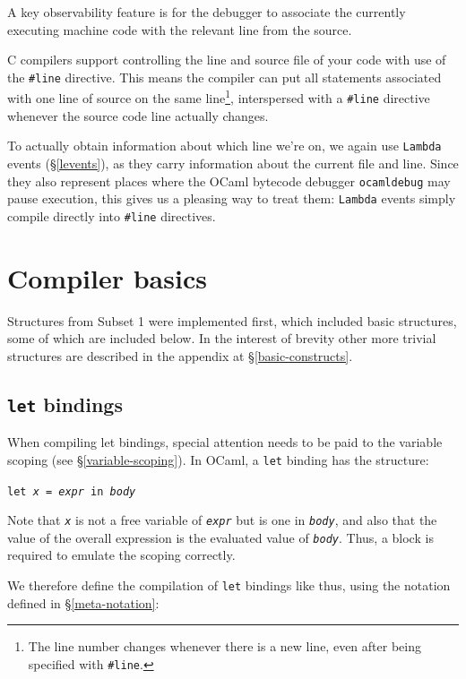 A key observability feature is for the debugger to associate the currently
executing machine code with the relevant line from the source.

C compilers support controlling the line and source file of your code with use
of the \texttt{\#}\texttt{line} directive. This means the compiler can put all
statements associated with one line of source on the same line\footnote{The line
    number changes whenever there is a new line, even after being specified with
\texttt{\#}\texttt{line}.}, interspersed with a \verb|#line| directive whenever
the source code line actually changes.

To actually obtain information about which line we're on, we again use
\texttt{Lambda} events (\S\ref{levents}), as they carry information about the
current file and line. Since they also represent places where the OCaml bytecode
debugger \texttt{ocamldebug} may pause execution, this gives us a pleasing way
to treat them: \texttt{Lambda} events simply compile directly into \verb|#line|
directives.

\section{Compiler basics} \label{compiler-basics}

Structures from Subset 1 were implemented first, which included basic
structures, some of which are included below. In the interest of brevity other
more trivial structures are described in the appendix at
\S\ref{basic-constructs}.

\subsection{\texttt{let} bindings}

When compiling let bindings, special attention needs to be paid to the variable
scoping (see \S\ref{variable-scoping}). In OCaml, a \texttt{let} binding has the
structure:

\begin{center}
    \texttt{let \emph{x} = \emph{expr} in \emph{body}}
\end{center}

Note that \texttt{\emph{x}} is not a free variable of \texttt{\emph{expr}} 
but is one in \texttt{\emph{body}}, and also that the value of the overall 
expression is the evaluated value of \texttt{\emph{body}}. Thus, a block is 
required to emulate the scoping correctly.

We therefore define the compilation of \texttt{let} bindings like thus, using
the notation defined in \S\ref{meta-notation}:

